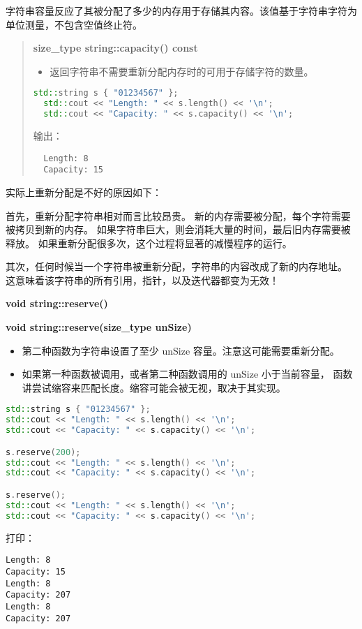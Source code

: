 \documentclass[../../LearnCpp.tex]{subfiles}
\begin{document}
字符串容量反应了其被分配了多少的内存用于存储其内容。该值基于字符串字符为单位测量，不包含空值终止符。

\begin{quotation}
  \textbf{size\_type string::capacity() const}

  \begin{itemize}
    \item 返回字符串不需要重新分配内存时的可用于存储字符的数量。
  \end{itemize}

  \begin{lstlisting}[language=C++]
  std::string s { "01234567" };
  std::cout << "Length: " << s.length() << '\n';
  std::cout << "Capacity: " << s.capacity() << '\n';
  \end{lstlisting}

  输出：

  \begin{lstlisting}
  Length: 8
  Capacity: 15
  \end{lstlisting}
\end{quotation}

实际上重新分配是不好的原因如下：

首先，重新分配字符串相对而言比较昂贵。
新的内存需要被分配，每个字符需要被拷贝到新的内存。
如果字符串巨大，则会消耗大量的时间，最后旧内存需要被释放。
如果重新分配很多次，这个过程将显著的减慢程序的运行。

其次，任何时候当一个字符串被重新分配，字符串的内容改成了新的内存地址。
这意味着该字符串的所有引用，指针，以及迭代器都变为无效！

\textbf{void string::reserve()}

\textbf{void string::reserve(size\_type unSize)}

\begin{itemize}
  \item 第二种函数为字符串设置了至少 unSize 容量。注意这可能需要重新分配。
  \item 如果第一种函数被调用，或者第二种函数调用的 unSize 小于当前容量，
        函数讲尝试缩容来匹配长度。缩容可能会被无视，取决于其实现。
\end{itemize}

\begin{lstlisting}[language=C++]
std::string s { "01234567" };
std::cout << "Length: " << s.length() << '\n';
std::cout << "Capacity: " << s.capacity() << '\n';

s.reserve(200);
std::cout << "Length: " << s.length() << '\n';
std::cout << "Capacity: " << s.capacity() << '\n';

s.reserve();
std::cout << "Length: " << s.length() << '\n';
std::cout << "Capacity: " << s.capacity() << '\n';
\end{lstlisting}

打印：

\begin{lstlisting}
Length: 8
Capacity: 15
Length: 8
Capacity: 207
Length: 8
Capacity: 207
\end{lstlisting}
\end{document}
